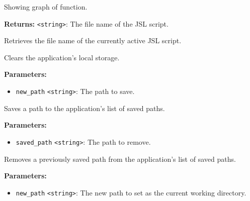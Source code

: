 \documentclass[12pt,a4paper]{article}
\begin{document}
\noindent Showing graph of function.

\vspace{5mm}
\noindent {}


\noindent \textbf{Returns:} \texttt{<string>}: The file name of the JSL script.

\noindent Retrieves the file name of the currently active JSL script.

\vspace{5mm}
\noindent {}


\noindent Clears the application's local storage.

\vspace{5mm}
\noindent {}


\noindent \textbf{Parameters:}
\begin{itemize}
  \item \texttt{new\_path} \texttt{<string>}: The path to save.
\end{itemize}

\noindent Saves a path to the application's list of saved paths.

\vspace{5mm}
\noindent {}


\noindent \textbf{Parameters:}
\begin{itemize}
  \item \texttt{saved\_path} \texttt{<string>}: The path to remove.
\end{itemize}

\noindent Removes a previously saved path from the application's list of saved paths.

\vspace{5mm}
\noindent {}


\noindent \textbf{Parameters:}
\begin{itemize}
  \item \texttt{new\_path} \texttt{<string>}: The new path to set as the current working directory.
\end{itemize}
\end{document}
